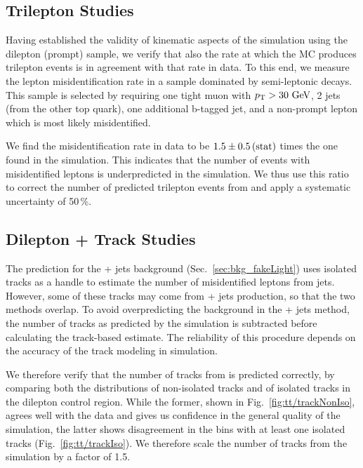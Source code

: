 \subsection{Trilepton Studies}
\label{sec:bkg_tt/trilepton}

Having established the validity of kinematic aspects of the \ttbar simulation using the dilepton (prompt) sample, we verify that also the rate at which the \ttbar MC produces trilepton events is in agreement with that rate in data. To this end, we measure the lepton misidentification rate in a sample dominated by semi-leptonic \ttbar decays. This sample is selected by requiring one tight muon with $p_{\mathrm{T}} > 30\,\,\text{Ge\hspace{-.08em}V}$, 2 jets (from the other top quark), one additional b-tagged jet, and a non-prompt lepton which is most likely misidentified.

We find the \ttbar misidentification rate in data to be $1.5 \pm 0.5\,\text{(stat)}$ times the one found in the \ttbar simulation. This indicates that the number of events with misidentified leptons is underpredicted in the \ttbar simulation. We thus use this ratio to correct the number of predicted trilepton events from \ttbar and apply a systematic uncertainty of 50\,\%.

\subsection{Dilepton + Track Studies}
\label{sec:bkg_tt/dilepton+track}

The prediction for the \Z + jets background (Sec.~\ref{sec:bkg_fakeLight}) uses isolated tracks as a handle to estimate the number of misidentified leptons from jets. However, some of these tracks may come from \ttbar + jets production, so that the two methods overlap. To avoid overpredicting the background in the \Z + jets method, the number of tracks as predicted by the \ttbar simulation is subtracted before calculating the track-based estimate. The reliability of this procedure depends on the accuracy of the track modeling in simulation.

We therefore verify that the number of tracks from \ttbar is predicted correctly, by comparing both the distributions of non-isolated tracks and of isolated tracks in the dilepton control region. While the former, shown in Fig.~\ref{fig:tt/trackNonIso}, agrees well with the data and gives us confidence in the general quality of the simulation, the latter shows disagreement in the bins with at least one isolated tracks (Fig.~\ref{fig:tt/trackIso}). We therefore scale the number of tracks from the \ttbar simulation by a factor of 1.5.

